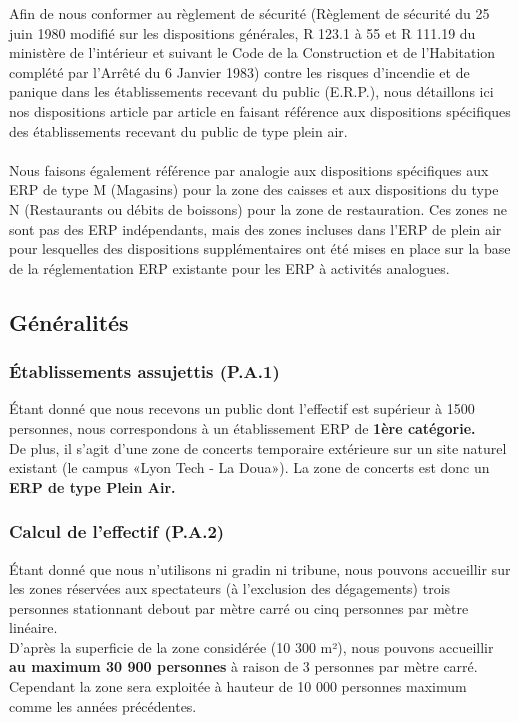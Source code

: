 \documentclass[hidelinks, paper=a4, fontsize=13pt]{report}
\begin{document}
Afin de nous conformer au règlement de sécurité (Règlement de sécurité du 25 juin 1980 modifié sur les dispositions générales, R 123.1 à 55 et R 111.19 du ministère de l’intérieur et suivant le Code de la Construction et de l’Habitation complété par l’Arrêté du 6 Janvier 1983) contre les risques d’incendie et de panique dans les établissements recevant du public (E.R.P.), nous détaillons ici nos dispositions article par article en faisant référence aux dispositions spécifiques des établissements recevant du public de type plein air.
\\\\
Nous faisons également référence par analogie aux dispositions spécifiques aux ERP de type  M (Magasins) pour la zone des caisses et aux dispositions du type N (Restaurants ou débits de boissons) pour la zone de restauration.
Ces zones ne sont pas des ERP indépendants, mais des zones incluses dans l’ERP de plein air pour lesquelles des dispositions supplémentaires ont été mises en place sur la base de la réglementation ERP existante pour les ERP à activités analogues.  

\subsection{Généralités}

\subsubsection{Établissements assujettis (P.A.1)}
Étant donné que nous recevons un public dont l’effectif est supérieur à 1500 personnes, nous correspondons à un établissement ERP de \textbf{1ère catégorie.} \\
De plus, il s’agit d’une zone de concerts temporaire extérieure sur un site naturel existant (le campus «Lyon Tech - La Doua»). La zone de concerts est donc un \textbf{ERP de type Plein Air.}

\subsubsection{Calcul de l’effectif (P.A.2)}
\label{calcul_de_leffectif} 

Étant donné que nous n’utilisons ni gradin ni tribune, nous pouvons accueillir sur les zones réservées aux spectateurs (à l’exclusion des dégagements) trois personnes stationnant debout par mètre carré ou cinq personnes par mètre linéaire. \\
D’après la superficie de la zone considérée (10 300 m²), nous pouvons accueillir \textbf{au maximum 30 900  personnes} à raison de 3 personnes par mètre carré.
Cependant la zone sera exploitée à hauteur de 10 000 personnes maximum comme les années précédentes.
\end{document}
